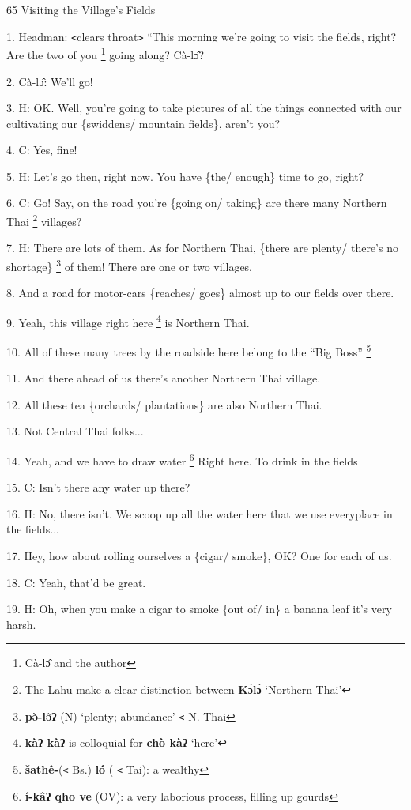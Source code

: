 
65 Visiting the Village's Fields

1. Headman: \texttt{<}clears throat\texttt{>} ``This morning we're going to visit
the fields, right? Are the two of you \footnote{Cà-lɔ̂ and the author} going along? Cà-lɔ̂?

2. Cà-lɔ̂: We'll go!

3. H: OK. Well, you're going to take pictures of all the things connected with
our cultivating our \{swiddens/ mountain fields\}, aren't you?

4. C: Yes, fine!

5. H: Let's go then, right now. You have \{the/ enough\} time to go, right?

6. C: Go! Say, on the road you're \{going on/ taking\} are there many Northern
Thai \footnote{The Lahu make a clear distinction between \textbf{Kɔ́lɔ́} `Northern Thai'} villages?

7. H: There are lots of them. As for Northern Thai, \{there are plenty/ there's
no shortage\} \footnote{\textbf{pə̀-lə̂ʔ} (N) `plenty; abundance' \texttt{<} N. Thai} of them! There are one or two villages.

8. And a road for motor-cars \{reaches/ goes\} almost up to our fields over there.

9. Yeah, this village right here \footnote{\textbf{ kàʔ kàʔ} is colloquial for\textbf{ chò kàʔ} `here'} is Northern Thai.

10. All of these many trees by the roadside here belong to the ``Big Boss'' \.\footnote{\textbf{šathê-}(\texttt{<} Bs.) \textbf{ló} ( \texttt{<} Tai): a wealthy}

11. And there ahead of us there's another Northern Thai village.

12. All these tea \{orchards/ plantations\} are also Northern Thai.

13. Not Central Thai folks...

14. Yeah, and we have to draw water \.\footnote{\textbf{ í-kâʔ qho ve} (OV): a very laborious process, filling up gourds} Right here. To drink in the fields

15. C: Isn't there any water up there?

16. H: No, there isn't. We scoop up all the water here that we use everyplace in
the fields...

17. Hey, how about rolling ourselves a \{cigar/ smoke\}, OK? One for each of us.

18. C: Yeah, that'd be great.

19. H: Oh, when you make a cigar to smoke \{out of/ in\} a banana leaf it's very
harsh.

